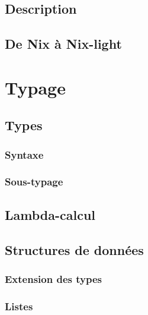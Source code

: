 \documentclass[frenchb]{scrartcl}
\newcommand{\τ}{\ensuremath{\tau}}
\begin{document}
\subsection{Description}

\subsection{De Nix à Nix-light}

\section{Typage}

\subsection{Types}

\subsubsection{Syntaxe}
\subsubsection{Sous-typage}

\subsection{Lambda-calcul}

\subsection{Structures de données}

\subsubsection{Extension des types}

\subsubsection{Listes}
\end{document}
